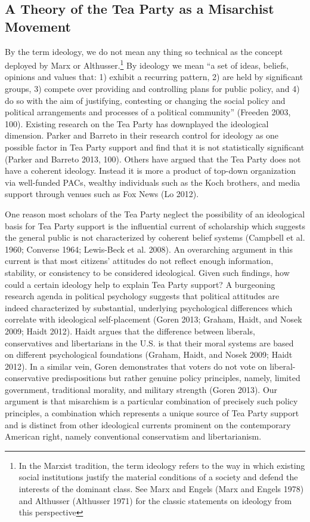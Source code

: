 \documentclass[12pt,]{article}
\let\rmarkdownfootnote\footnote%
\def\footnote{\protect\rmarkdownfootnote}
\begin{document}
\subsection{A Theory of the Tea Party as a Misarchist
Movement}\label{a-theory-of-the-tea-party-as-a-misarchist-movement}

By the term ideology, we do not mean any thing so technical as the
concept deployed by Marx or Althusser.\footnote{In the Marxist
  tradition, the term ideology refers to the way in which existing
  social institutions justify the material conditions of a society and
  defend the interests of the dominant class. See Marx and Engels (Marx
  and Engels 1978) and Althusser (Althusser 1971) for the classic
  statements on ideology from this perspective} By ideology we mean ``a
set of ideas, beliefs, opinions and values that: 1) exhibit a recurring
pattern, 2) are held by significant groups, 3) compete over providing
and controlling plans for public policy, and 4) do so with the aim of
justifying, contesting or changing the social policy and political
arrangements and processes of a political community'' (Freeden 2003,
100). Existing research on the Tea Party has downplayed the ideological
dimension. Parker and Barreto in their research control for ideology as
one possible factor in Tea Party support and find that it is not
statistically significant (Parker and Barreto 2013, 100). Others have
argued that the Tea Party does not have a coherent ideology. Instead it
is more a product of top-down organization via well-funded PACs, wealthy
individuals such as the Koch brothers, and media support through venues
such as Fox News (Lo 2012).

One reason most scholars of the Tea Party neglect the possibility of an
ideological basis for Tea Party support is the influential current of
scholarship which suggests the general public is not characterized by
coherent belief systems (Campbell et al. 1960; Converse 1964; Lewis-Beck
et al. 2008). An overarching argument in this current is that most
citizens' attitudes do not reflect enough information, stability, or
consistency to be considered ideological. Given such findings, how could
a certain ideology help to explain Tea Party support? A burgeoning
research agenda in political psychology suggests that political
attitudes are indeed characterized by substantial, underlying
psychological differences which correlate with ideological
self-placement (Goren 2013; Graham, Haidt, and Nosek 2009; Haidt 2012).
Haidt argues that the difference between liberals, conservatives and
libertarians in the U.S. is that their moral systems are based on
different psychological foundations (Graham, Haidt, and Nosek 2009;
Haidt 2012). In a similar vein, Goren demonstrates that voters do not
vote on liberal-conservative predispositions but rather genuine policy
principles, namely, limited government, traditional morality, and
military strength (Goren 2013). Our argument is that misarchism is a
particular combination of precisely such policy principles, a
combination which represents a unique source of Tea Party support and is
distinct from other ideological currents prominent on the contemporary
American right, namely conventional conservatism and libertarianism.
\end{document}
